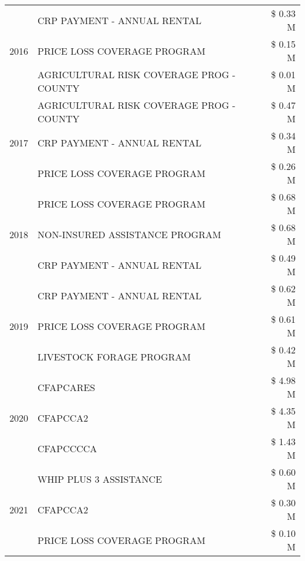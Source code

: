 \begin{tabular}{llr}
\cline{1-3}
\multirow[t]{3}{*}{2016} & CRP PAYMENT - ANNUAL RENTAL                   & \$ 0.33 M \\
 & PRICE LOSS COVERAGE PROGRAM                   & \$ 0.15 M \\
 & AGRICULTURAL RISK COVERAGE PROG - COUNTY      & \$ 0.01 M \\
\cline{1-3}
\multirow[t]{3}{*}{2017} & AGRICULTURAL RISK COVERAGE PROG - COUNTY & \$ 0.47 M \\
 & CRP PAYMENT - ANNUAL RENTAL & \$ 0.34 M \\
 & PRICE LOSS COVERAGE PROGRAM & \$ 0.26 M \\
\cline{1-3}
\multirow[t]{3}{*}{2018} & PRICE LOSS COVERAGE PROGRAM & \$ 0.68 M \\
 & NON-INSURED ASSISTANCE PROGRAM & \$ 0.68 M \\
 & CRP PAYMENT - ANNUAL RENTAL & \$ 0.49 M \\
\cline{1-3}
\multirow[t]{3}{*}{2019} & CRP PAYMENT - ANNUAL RENTAL & \$ 0.62 M \\
 & PRICE LOSS COVERAGE PROGRAM & \$ 0.61 M \\
 & LIVESTOCK FORAGE PROGRAM & \$ 0.42 M \\
\cline{1-3}
\multirow[t]{3}{*}{2020} & CFAPCARES & \$ 4.98 M \\
 & CFAPCCA2 & \$ 4.35 M \\
 & CFAPCCCCA & \$ 1.43 M \\
\cline{1-3}
\multirow[t]{3}{*}{2021} & WHIP PLUS 3 ASSISTANCE & \$ 0.60 M \\
 & CFAPCCA2 & \$ 0.30 M \\
 & PRICE LOSS COVERAGE PROGRAM & \$ 0.10 M \\
\cline{1-3}
\bottomrule
\end{tabular}
